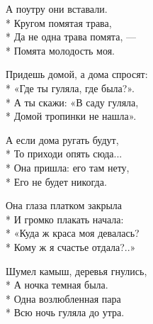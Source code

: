 \medskip

\begin{minipage}{\linewidth}
А поутру они вставали.\\*
Кругом помятая трава,\\*
Да не одна трава помята, —\\*
Помята молодость моя.\\
\end{minipage}\par\medskip\nobreak

\medskip

\begin{minipage}{\linewidth}
Придешь домой, а дома спросят:\\*
«Где ты гуляла, где была?».\\*
А ты скажи: «В саду гуляла,\\*
Домой тропинки не нашла».\\
\end{minipage}\par\medskip\nobreak

\medskip

\begin{minipage}{\linewidth}
А если дома ругать будут,\\*
То приходи опять сюда...\\*
Она пришла: его там нету,\\*
Его не будет никогда.\\
\end{minipage}\par\medskip\nobreak

\medskip

\begin{minipage}{\linewidth}
Она глаза платком закрыла\\*
И громко плакать начала:\\*
«Куда ж краса моя девалась?\\*
Кому ж я счастье отдала?..»\\
\end{minipage}\par\medskip\nobreak

\medskip

\begin{minipage}{\linewidth}
Шумел камыш, деревья гнулись,\\*
А ночка темная была.\\*
Одна возлюбленная пара\\*
Всю ночь гуляла до утра.\\
\end{minipage}

